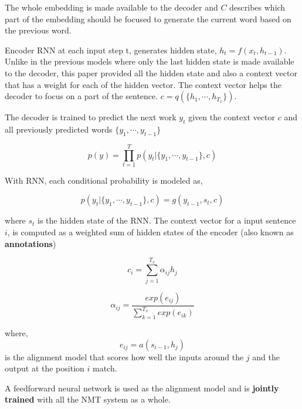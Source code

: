 \documentclass[a4paper]{article}
\begin{document}
The whole embedding is  made available to  the decoder  and $C$  describes which
part of  the embedding should be focused to generate  the current word based  on
the previous word.

Encoder  RNN  at  each  input  step t, generates hidden  state,  $h_t  =  f(x_t,
h_{t-1})$.  Unlike  in the previous models where  only the last hidden state  is
made available to the decoder, this paper provided all the hidden state and also
a  context vector that has a weight for each of the  hidden vector. The  context
vector  helps   the  decoder  to  focus  on  a  part  of  the  sentence.  $c   =
q(\{h_1,\cdots,h_{T_x}\})$.


The decoder is trained to predict the next work $y_t$  given the context  vector
$c$ and all previously predicted words $\{ y_1, \cdots, y_{t-1}\}$


\begin{equation*}
  p(y) = \prod^{T}_{t=1} p(y_t | \{ y_1, \cdots, y_{t-1}\} ,c )
\end{equation*}


With RNN, each conditional probability is modeled as,


\begin{equation*}
  p(y_t | \{ y_1, \cdots, y_{t-1}\}, c) = g(y_{t-1}, s_t, c)
\end{equation*}


where  $s_t$ is the hidden  state  of  the RNN. The context vector  for a  input
sentence $i$, is  computed  as  a weighted  sum of  hidden states of the encoder
(also known as \textbf{annotations})


\begin{equation*}
  c_i = \sum_{j=1}^{T_{x}} \alpha_{ij} h_j
\end{equation*}


\begin{equation*}
  \alpha_{ij} = \frac{ exp(e_{ij})}{ \sum_{k=1}^{T_x} exp (e_{ik})}
\end{equation*}


where, $$ e_{ij}  = a(s_{i-1},  h_j)  $$ is the alignment model that  scores how
well the inputs around the $j$ and the output at the position $i$ match.

A   feedforward  neural  network   is  used  as   the  alignment  model  and  is
\textbf{jointly trained} with all the NMT system as a whole.
\end{document}
